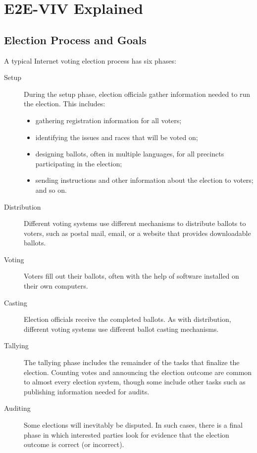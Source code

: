 \chapter{E2E-VIV Explained}
\label{chapter:e2e_viv_explained}

\section{Election Process and Goals}
A typical Internet voting election process has six phases:

\begin{description}
  \item[Setup] During the setup phase, election officials gather 
    information needed to run the election. This includes:
    \begin{itemize}
     \item gathering registration information for all voters;
     \item identifying the issues and races that will be voted on;
     \item designing ballots, often in multiple languages, for all
       precincts participating in the election;
     \item sending instructions and other information about the
       election to voters; and so on.
    \end{itemize}
  \item[Distribution] Different voting systems use different
    mechanisms to distribute ballots to voters, such as postal mail,
    email, or a website that provides downloadable ballots.
  \item[Voting] Voters fill out their ballots, often with the help of
    software installed on their own computers.
  \item[Casting] Election officials receive the completed ballots. As
    with distribution, different voting systems use different ballot
    casting mechanisms.
  \item[Tallying] The tallying phase includes the remainder of the
    tasks that finalize the election. Counting votes and announcing
    the election outcome are common to almost every election system,
    though some include other tasks such as publishing information
    needed for audits.
  \item[Auditing] Some elections will inevitably be disputed. In such
    cases, there is a final phase in which interested parties look for
    evidence that the election outcome is correct (or incorrect).
\end{description}

